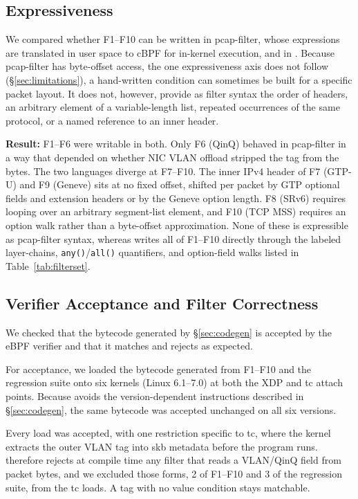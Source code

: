 \subsection{Expressiveness}
\label{sec:eval-expr}

We compared whether F1--F10 can be written in pcap-filter, whose
expressions are translated in user space to cBPF for in-kernel
execution, and in \kunai. Because pcap-filter
has byte-offset access, the one expressiveness axis \kunai does
not follow (\S\ref{sec:limitations}), a hand-written
condition can sometimes be built for a specific packet layout. It does
not, however, provide as filter syntax the order of headers, an
arbitrary element of a variable-length list, repeated occurrences of
the same protocol, or a named reference to an inner header.

\textbf{Result:} F1--F6 were writable in both. Only
F6 (QinQ) behaved in pcap-filter in a way that depended on whether NIC
VLAN offload stripped the tag from the bytes. The two languages diverge
at F7--F10. The inner IPv4 header of F7 (GTP-U)
and F9 (Geneve) sits at no fixed offset, shifted per packet by GTP
optional fields and extension headers or by the Geneve option length.
F8 (SRv6) requires looping over an arbitrary segment-list element, and
F10 (TCP MSS) requires an option walk rather than a byte-offset
approximation. None of these is expressible as pcap-filter
syntax, whereas \kunai writes all of F1--F10 directly through the
labeled layer-chains, \texttt{any()}/\texttt{all()} quantifiers, and
option-field walks listed in Table~\ref{tab:filterset}.

\subsection{Verifier Acceptance and Filter Correctness}
\label{sec:eval-accept}

We checked that the bytecode generated by \S\ref{sec:codegen} is
accepted by the eBPF verifier and that it matches and rejects as
expected.

For acceptance, we loaded the bytecode generated from F1--F10 and the
regression suite onto six kernels (Linux 6.1--7.0) at both the XDP and
tc attach points. Because \kunai avoids the version-dependent
instructions described in \S\ref{sec:codegen}, the same bytecode was
accepted unchanged on all six versions.

Every load was accepted, with one restriction specific to tc, where
the kernel extracts the outer VLAN tag into skb metadata before the
program runs. \kunai therefore rejects at compile time any filter that
reads a VLAN/QinQ field from packet bytes, and we excluded those
forms, 2 of F1--F10 and 3 of the regression suite, from the tc loads.
A tag with no value condition stays matchable.


